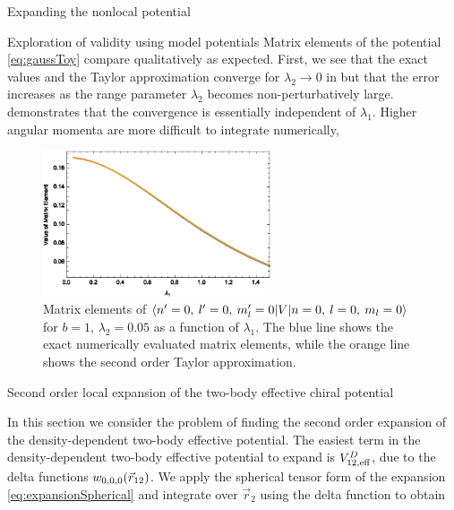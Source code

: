 \begin{section}{Expanding the nonlocal potential}
\begin{section}{Exploration of validity using model potentials \label{sec:toyModel}}
Matrix elements of the potential \eqref{eq:gaussToy} compare qualitatively as expected. First, we see that the exact values and the Taylor approximation converge for $\lambda_2\rightarrow 0$ in  but that the error increases as the range parameter $\lambda_2$ becomes non-perturbatively large.  demonstrates that the convergence is essentially independent of $\lambda_1$. Higher angular momenta are more difficult to integrate numerically, 


\begin{figure}[htb]
\centering \includegraphics[width=0.6\textwidth]{LocalExpansion/Figures/ToyPotential000000l1} 
\caption{Matrix elements of $\braket{n'=0,\: l'=0,\: m_l'=0 | V | n=0,\: l=0,\: m_l=0}$ for $b=1$, $\lambda_2=0.05$ as a function of $\lambda_1$. The blue line shows the exact numerically evaluated matrix elements, while the orange line shows the second order Taylor approximation.
\label{fig:gaussToy2}}
\end{figure}

\end{section}

\begin{section}{Second order local expansion of the two-body effective chiral potential}

In this section we consider the problem of finding the second order expansion of the density-dependent two-body effective potential. The easiest term in the density-dependent two-body effective potential to expand is $V_{12,\text{eff}}^D$, due to the delta functions $w_{0,0,0}(\vec{r}_{12})$. We apply the spherical tensor form of the expansion \eqref{eq:expansionSpherical} and integrate over $\vec{r}_2$ using the delta function to obtain


\end{section}
\end{section}
